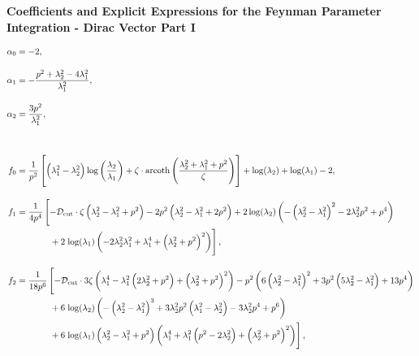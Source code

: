 \newcommand{\col}[1]{\label{eq:coeff_A_#1}\qquad\qquad}
\newenvironment{titledeqns}[1]{\large\bfseries{#1}
}{}

\newcommand{\tunedvs}{3pt}

\makeatletter 
\def\leqno{\tagsleft@true}\def\reqno{\tagsleft@false} 
\makeatother 

\leqno

\hspace{0pt}
\begin{titledeqns}{Coefficients and Explicit Expressions for the Feynman Parameter Integration - Dirac Vector Part I}
\begin{align}
 \alpha_0 &= -2, \\[1em]
\alpha_1 &= -\frac{p^2+\lambda_2^2 - 4\lambda_1^2}{\lambda_1^2}, \\[1em]
\alpha_2 &= \frac{3p^2}{\lambda_1^2}, \\[3em]
f_0 &= \frac{1}{p^2}\left[\left(\lambda_1^2-\lambda_2^2\right)  \operatorname{log} \left(\frac{\lambda_2}{\lambda_1}\right)+\zeta\cdot \operatorname{arcoth}\left(\frac{\lambda_2^2+\lambda_1^2+p^2}{\zeta}\right)\right] + \operatorname{log} (\lambda_2)+ \operatorname{log} (\lambda_1)-2, \\[1em]
f_1 &=  \frac{1}{4 p^4}\left[-\mathcal{D}_{\mathrm{cut}}\cdot\zeta\left(\lambda_2^2-\lambda_1^2+p^2\right) -2 p^2 \left(\lambda_2^2-\lambda_1^2+2 p^2\right)+2 \operatorname{log} (\lambda_2) \left(-\left(\lambda_2^2-\lambda_1^2\right)^2-2 \lambda_2^2 p^2+p^4\right)  \right. \\ &\hspace{3.81em}+2 \left. \operatorname{log} (\lambda_1) \left(-2 \lambda_2^2 \lambda_1^2+\lambda_1^4+\left(\lambda_2^2+p^2\right)^2\right)\right],\notag \\[1em]
 f_2 &= \frac{1}{18 p^6}\left[-\mathcal{D}_{\mathrm{cut}}\cdot 3\zeta \left(\lambda_1^4-\lambda_1^2 \left(2 \lambda_2^2+p^2\right)+\left(\lambda_2^2+p^2\right)^2\right) -p^2 \left(6 \left(\lambda_2^2-\lambda_1^2\right)^2+3 p^2 \left(5 \lambda_2^2-\lambda_1^2\right)+13 p^4\right)  \right. \\ &\hspace{3.81em}+6 \left.\operatorname{log} (\lambda_2) \left(-\left(\lambda_2^2-\lambda_1^2\right)^3+3 \lambda_2^2 p^2 \left(\lambda_1^2-\lambda_2^2\right)-3 \lambda_2^2 p^4+p^6\right)  \right.\notag \\ &\hspace{3.81em}+6 \left. \operatorname{log} (\lambda_1) \left(\lambda_2^2-\lambda_1^2+p^2\right) \left(\lambda_1^4+\lambda_1^2 \left(p^2-2 \lambda_2^2\right)+\left(\lambda_2^2+p^2\right)^2\right)\right], \notag
\end{align}
\end{titledeqns}
